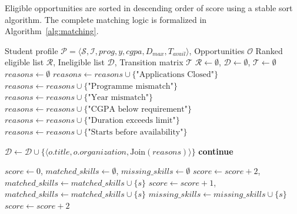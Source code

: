 Eligible opportunities are sorted in descending order of score using a stable sort algorithm. The complete matching logic is formalized in Algorithm~\ref{alg:matching}.

\begin{algorithm}[h!]
\caption{Two-Stage Deterministic Internship Matching Algorithm}
\label{alg:matching}
\begin{algorithmic}[1]
\Require Student profile $\mathcal{P} = \langle \mathcal{S}, \mathcal{I}, prog, y, cgpa, D_{max}, T_{avail} \rangle$, Opportunities $\mathcal{O}$
\Ensure Ranked eligible list $\mathcal{R}$, Ineligible list $\mathcal{D}$, Transition matrix $\mathcal{T}$
\State $\mathcal{R} \gets \emptyset$, $\mathcal{D} \gets \emptyset$, $\mathcal{T} \gets \emptyset$
    \State $reasons \gets \emptyset$
     \State $reasons \gets reasons \cup \{\text{"Applications Closed"}\}$ \EndIf
     \State $reasons \gets reasons \cup \{\text{"Programme mismatch"}\}$ \EndIf
     \State $reasons \gets reasons \cup \{\text{"Year mismatch"}\}$ \EndIf
        \State $reasons \gets reasons \cup \{\text{"CGPA below requirement"}\}$
    \EndIf
     \State $reasons \gets reasons \cup \{\text{"Duration exceeds limit"}\}$ \EndIf
     \State $reasons \gets reasons \cup \{\text{"Starts before availability"}\}$ \EndIf
    
        \State $\mathcal{D} \gets \mathcal{D} \cup \{\langle o.title, o.organization, \text{Join}(reasons) \rangle\}$
        \State \textbf{continue}
    \EndIf
    
    \State $score \gets 0$, $matched\_skills \gets \emptyset$, $missing\_skills \gets \emptyset$
         \State $score \gets score + 2$, $matched\_skills \gets matched\_skills \cup \{s\}$
         \State $score \gets score + 1$, $matched\_skills \gets matched\_skills \cup \{s\}$
        \Else \State $missing\_skills \gets missing\_skills \cup \{s\}$
        \EndIf
    \EndFor
     \State $score \gets score + 2$ \EndIf
    

\end{algorithmic}
\end{algorithm}
